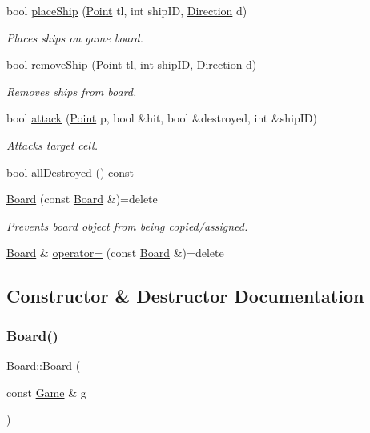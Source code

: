 \begin{DoxyCompactItemize}
bool \mbox{\hyperlink{class_board_a47be427a7c565e29dd2606c95972bf91}{place\+Ship}} (\mbox{\hyperlink{class_point}{Point}} tl, int ship\+ID, \mbox{\hyperlink{_globals_8h_a224b9163917ac32fc95a60d8c1eec3aa}{Direction}} d)
\begin{DoxyCompactList}\small\item\em Places ships on game board. \end{DoxyCompactList}\item 
bool \mbox{\hyperlink{class_board_a7d2f52e12bb4c861a1484ec0f54897d0}{remove\+Ship}} (\mbox{\hyperlink{class_point}{Point}} tl, int ship\+ID, \mbox{\hyperlink{_globals_8h_a224b9163917ac32fc95a60d8c1eec3aa}{Direction}} d)
\begin{DoxyCompactList}\small\item\em Removes ships from board. \end{DoxyCompactList}\item 
bool \mbox{\hyperlink{class_board_aad9932b230d16c6eef6fd9305399fbd2}{attack}} (\mbox{\hyperlink{class_point}{Point}} p, bool \&hit, bool \&destroyed, int \&ship\+ID)
\begin{DoxyCompactList}\small\item\em Attacks target cell. \end{DoxyCompactList}\item 
bool \mbox{\hyperlink{class_board_a4653d3028e70fea9f56523173a2e0a13}{all\+Destroyed}} () const
\item 
\mbox{\hyperlink{class_board_a1b25abe81ff08e6b574ecfc2dcaaa5be}{Board}} (const \mbox{\hyperlink{class_board}{Board}} \&)=delete
\begin{DoxyCompactList}\small\item\em Prevents board object from being copied/assigned. \end{DoxyCompactList}\item 
\mbox{\hyperlink{class_board}{Board}} \& \mbox{\hyperlink{class_board_a892306c4b944bfe904b297092763084a}{operator=}} (const \mbox{\hyperlink{class_board}{Board}} \&)=delete
\end{DoxyCompactItemize}


\subsection{Constructor \& Destructor Documentation}
\mbox{\label{class_board_aa08d83943c9f7c727a96175feb05f1f8}} 
\subsubsection{\texorpdfstring{Board()}{Board()}\hspace{0.1cm}{\footnotesize\ttfamily [1/2]}}
{\footnotesize\ttfamily Board\+::\+Board (\begin{DoxyParamCaption}\item[{const \mbox{\hyperlink{class_game}{Game}} \&}]{g }\end{DoxyParamCaption})}



